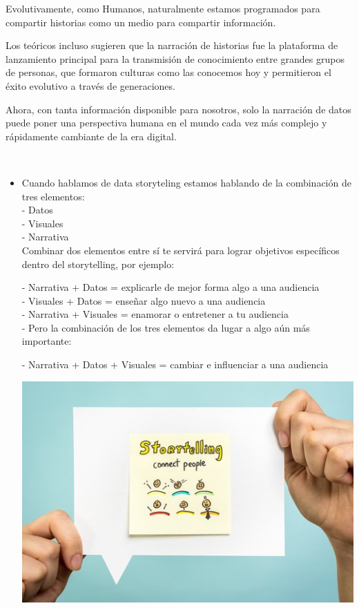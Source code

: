 {{{Evolutivamente, como Humanos, naturalmente estamos programados para compartir historias como un medio para compartir información.

Los teóricos incluso sugieren que la narración de historias fue la plataforma de lanzamiento principal para la transmisión de conocimiento entre grandes grupos de personas, que formaron culturas como las conocemos hoy y permitieron el éxito evolutivo a través de generaciones.

Ahora, con tanta información disponible para nosotros, solo la narración de datos puede poner una perspectiva humana en el mundo cada vez más complejo y rápidamente cambiante de la era digital.}

\begin{center}
\caption\textbf{Los tres elementos del data storytelling}
\end{center}
\\
\begin{itemize}
\item Cuando hablamos de data storyteling estamos hablando de la combinación de tres elementos:\\

- Datos\\
- Visuales\\
- Narrativa\\

Combinar dos elementos entre sí te servirá para lograr objetivos específicos dentro del storytelling, por ejemplo:

- Narrativa + Datos = explicarle de mejor forma algo a una audiencia\\

- Visuales + Datos = enseñar algo nuevo a una audiencia\\

- Narrativa + Visuales = enamorar o entretener a tu audiencia\\

- Pero la combinación de los tres elementos da lugar a algo aún más importante:

- Narrativa + Datos + Visuales = cambiar e influenciar a una audiencia

		\begin{center}
		\includegraphics[width=15cm]{./Imagenes/Ejemplo2}
		\end{center}


\end{itemize}}}
